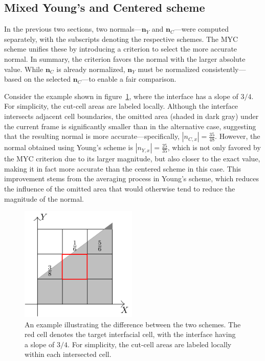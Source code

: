 \subsection{Mixed Young's and Centered scheme}\label{sec:myc-myc}
In the previous two sections, two normals—$\mathbf{n}_Y$ and $\mathbf{n}_C$—were computed separately, with the subscripts denoting the respective schemes. The MYC scheme unifies these by introducing a criterion to select the more accurate normal. In summary, the criterion favors the normal with the larger absolute value. While $\mathbf{n}_C$ is already normalized, $\mathbf{n}_Y$ must be normalized consistently—based on the selected $\mathbf{n}_C$—to enable a fair comparison.

Consider the example shown in figure~\ref{fig:myc-MYC}, where the interface has a slope of $3/4$. For simplicity, the cut-cell areas are labeled locally. Although the interface intersects adjacent cell boundaries, the omitted area (shaded in dark gray) under the current frame is significantly smaller than in the alternative case, suggesting that the resulting normal is more accurate—specifically, $|n_{C,x}| = \frac{35}{48}$. However, the normal obtained using Young’s scheme is $|n_{Y,x}| = \frac{25}{35}$, which is not only favored by the MYC criterion due to its larger magnitude, but also closer to the exact value, making it in fact more accurate than the centered scheme in this case. This improvement stems from the averaging process in Young’s scheme, which reduces the influence of the omitted area that would otherwise tend to reduce the magnitude of the normal.


\begin{figure}[H]
  \centering
  \includegraphics[height=5.5cm]{./image/myc-h-and-myc2d-h/MYC.pdf}
  \caption{An example illustrating the difference between the two schemes. The red cell denotes the target interfacial cell, with the interface having a slope of $3/4$. For simplicity, the cut-cell areas are labeled locally within each intersected cell.}
  \label{fig:myc-MYC}
\end{figure}

